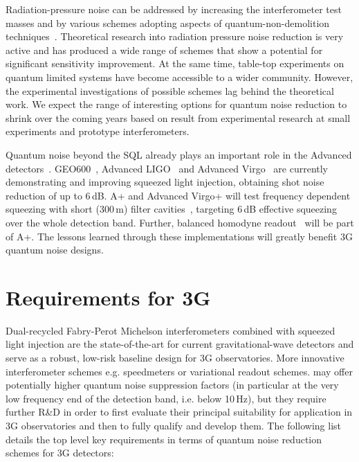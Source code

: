 Radiation-pressure noise can be addressed by increasing the interferometer test masses and by various schemes adopting aspects of quantum-non-demolition techniques~\cite{KLMTV2001,PuCh2002,Che2003,Braginsky:2004fp}. Theoretical research into radiation pressure noise reduction is very active and has produced a wide range of schemes that show a potential for significant sensitivity improvement. At the same time, table-top experiments on quantum limited systems have become accessible to a wider community. However, the experimental investigations of possible schemes lag behind the theoretical work. We expect the range of interesting options for quantum noise reduction to shrink over the coming years based on result from experimental research at small experiments and prototype interferometers.

Quantum noise beyond the SQL already plays an important role in the Advanced detectors~\cite{BuCh2001}. GEO600~\cite{GEO:Squeezing}, Advanced LIGO~\cite{H1:Squeezing,AdvancedLIGO2015} and Advanced Virgo~\cite{AdvancedVirgo2015} are currently demonstrating and improving squeezed light injection, obtaining shot noise reduction of up to 6\,dB. A+ and Advanced Virgo+ will test frequency dependent squeezing with short (300\,m) filter cavities~\cite{Eva2013,TAMA_FDS2016}, targeting 6\,dB effective squeezing over the whole detection band. Further, balanced homodyne readout~\cite{BHD,Stefszky:Balanced2012} will be part of A+. The lessons learned through these implementations will greatly benefit 3G quantum noise designs.

\section{Requirements for 3G}
Dual-recycled Fabry-Perot Michelson interferometers combined with squeezed light injection are the state-of-the-art for current gravitational-wave detectors and serve as a robust, low-risk baseline design for 3G observatories. More innovative interferometer schemes e.g. speedmeters or variational readout schemes.
may offer potentially higher quantum noise suppression factors (in particular at the very low frequency end of the detection band, i.e. below 10\,Hz),  but they require further R\&D 
 in order to first evaluate their principal suitability for application in 3G observatories and then to fully qualify and develop them. 
The following list details the top level  key requirements in terms of quantum noise reduction schemes   for 3G detectors:

